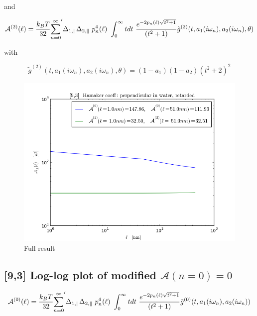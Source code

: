 \documentclass[a4paper]{article}
\begin{document}
\begin{center}

and

\begin{equation}
{\cal A}^{(2)}(\ell) = \frac{k_BT}{32}  {\sum_{n=0}^{\infty}}' \Delta_{1,\parallel} \Delta_{2,\parallel} ~p_n^{4}(\ell) ~\int_0^{\infty} t dt ~\frac{e^{- 2 p_n(\ell) \sqrt{t^{2} + 1}}}{(t^{2} + 1)} \tilde g^{(2)}(t, a_1(i \omega_n), a_2(i \omega_n), \theta)
\end{equation}

with

\begin{equation}
\tilde g^{(2)}(t, a_1(i \omega_n), a_2(i \omega_n), \theta) = (1-a_1)(1-a_2)(t^{2} + 2)^2
\label{befgqw}
\end{equation}

\begin{figure}[t!]
\begin{center}
\includegraphics[width=1.0\textwidth]{plots/140322_93w93_HCs_perpendicular_ret.png}
\hskip 43pt
\caption{Full result}
\label{eiz65}
\end{center}
\end{figure} 

\subsection{[9,3] Log-log plot of modified $\mathcal{A}(n=0)=0$}
\begin{equation}
{\cal A}^{(0)}(\ell) = \frac{k_BT}{32}  {\sum_{n=0}^{\infty}}' \Delta_{1,\parallel} \Delta_{2,\parallel} ~p_n^{4}(\ell) ~\int_0^{\infty} t dt ~\frac{e^{- 2 p_n(\ell) \sqrt{t^{2} + 1}}}{(t^{2} + 1)} \tilde g^{(0)}(t, a_1(i \omega_n), a_2(i \omega_n))
\end{equation}


\end{center}
\end{document}
